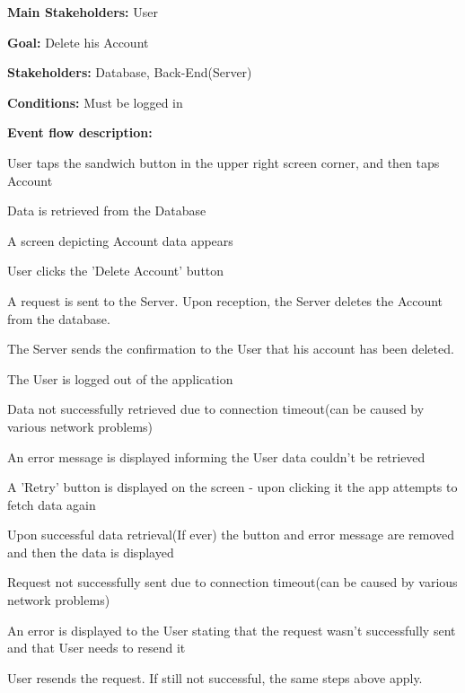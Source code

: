 				\noindent {}
				\begin{packed_item}
					\item \textbf{Main Stakeholders:} User
					\item \textbf{Goal:} Delete his Account
					\item \textbf{Stakeholders:} Database, Back-End(Server)
					\item \textbf{Conditions:} Must be logged in
					\item \textbf{Event flow description: }
					\begin{packed_enum}
						\item User taps the sandwich button in the upper right screen corner, and then taps Account
						\item Data is retrieved from the Database
						\item A screen depicting Account data appears
						\item User clicks the 'Delete Account' button
						\item A request is sent to the Server. Upon reception, the Server deletes the Account from the database.
						\item The Server sends the confirmation to the User that his account has been deleted.
						\item The User is logged out of the application
					\end{packed_enum}
					
					\begin{packed_item}
						\item[2.a] Data not successfully retrieved due to connection timeout(can be caused by various network problems)
						\item[] \begin{packed_enum}
							\item An error message is displayed informing the User data couldn't be retrieved
							\item A 'Retry' button is displayed on the screen - upon clicking it the app attempts to fetch data again
							\item Upon successful data retrieval(If ever) the button and error message are removed and then the data is displayed
						\end{packed_enum}
						
						\item[5.a] Request not successfully sent due to connection timeout(can be caused by various network problems)
						\item[] \begin{packed_enum}
							\item An error is displayed to the User stating that the request wasn't successfully sent and that User needs to resend it
							\item User resends the request. If still not successful, the same steps above apply.
						\end{packed_enum}
						

\end{packed_item}
\end{packed_item}

